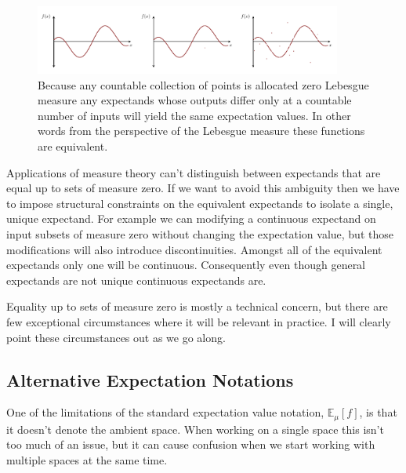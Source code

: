 \documentclass[
  letterpaper,
  DIV=11,
  numbers=noendperiod]{scrartcl}
\begin{document}
\begin{figure}

{\centering \includegraphics[width=0.9\textwidth,height=\textheight]{figures/equivalent_expectands/equivalent_expectands.pdf}

}

\caption{\label{fig-equivalent-expectands}Because any countable
collection of points is allocated zero Lebesgue measure any expectands
whose outputs differ only at a countable number of inputs will yield the
same expectation values. In other words from the perspective of the
Lebesgue measure these functions are equivalent.}

\end{figure}

Applications of measure theory can't distinguish between expectands that
are equal up to sets of measure zero. If we want to avoid this ambiguity
then we have to impose structural constraints on the equivalent
expectands to isolate a single, unique expectand. For example we can
modifying a continuous expectand on input subsets of measure zero
without changing the expectation value, but those modifications will
also introduce discontinuities. Amongst all of the equivalent expectands
only one will be continuous. Consequently even though general expectands
are not unique continuous expectands are.

Equality up to sets of measure zero is mostly a technical concern, but
there are few exceptional circumstances where it will be relevant in
practice. I will clearly point these circumstances out as we go along.

\hypertarget{sec:alt_notations}{%
\subsection{Alternative Expectation Notations}\label{sec:alt_notations}}

One of the limitations of the standard expectation value notation,
\(\mathbb{E}_{\mu}[f]\), is that it doesn't denote the ambient space.
When working on a single space this isn't too much of an issue, but it
can cause confusion when we start working with multiple spaces at the
same time.
\end{document}
